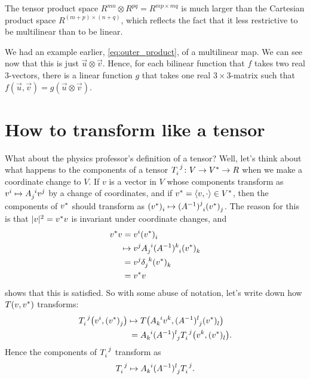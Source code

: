 \documentclass[english, 12pt]{article}
\begin{document}
The tensor product space $R^{mn} \otimes R^{pq} = R^{mp \times mq}$ is much larger than the Cartesian product space $R^{(m + p) \times (n + q)}$, which reflects the fact that it less restrictive to be multilinear than to be linear.

We had an example earlier, \cref{eq:outer_product}, of a multilinear map.
We can see now that this is just $\vec u \otimes \vec v$.
Hence, for each bilinear function that $f$ takes two real $3$-vectors, there is a linear function $g$ that takes one real $3\times3$-matrix such that $f(\vec u, \vec v) = g(\vec u \otimes \vec v)$.


\section{How to transform like a tensor}%
\label{sec:how_to_transform_like_a_tensor}

What about the physics professor's definition of a tensor?
Well, let's think about what happens to the components of a tensor $\tensor{T}{_i^j} \from V \to \dual V \to R$ when we make a coordinate change to $V$.
If $v$ is a vector in $V$ whose components transform as $\tensor{v}{^i} \mapsto \tensor{A}{_j^i} \tensor{v}{^j}$ by a change of coordinates, and if ${v}^{*} = \langle v, \cdot \rangle \in {V}^{*}$, then the components of ${v}^{*}$ should transform as $\tensor{(\dual v)}{_i} \mapsto \tensor{(A^{-1})}{^j_i} \tensor{(\dual v)}{_j}$.
The reason for this is that $|v|^2 = {v}^{*} v$ is invariant under coordinate changes, and
\begin{align*}
	\dual v v ={}& \tensor{v}{^i} \tensor{(\dual v)}{_i}\\
	\mapsto{}& \tensor{v}{^j} \tensor{A}{_j^i} \tensor{(A^{-1})}{^k_i} \tensor{(\dual v)}{_k}\\
	={}& \tensor{v}{^j} \tensor{\delta}{_j^k} \tensor{(\dual v)}{_k}\\
	={}& \dual v v
\end{align*}
shows that this is satisfied.
So with some abuse of notation, let's write down how $T(v, {v}^{*})$ transforms:
\begin{align*}
	\tensor{T}{_i^j}\big(
		\tensor{v}{^i},
		\tensor{(\dual v)}{_j}
	\big)
	\mapsto{}& T\big(
		\tensor{A}{_k^i} \tensor{v}{^k},
		\tensor{(A^{-1})}{^l_j} \tensor{(\dual v)}{_l}
	\big)\\
	={}& \tensor{A}{_k^i} \tensor{(A^{-1})}{^l_j} \tensor{T}{_i^j}
	\big(
		\tensor{v}{^k},
		\tensor{(\dual v)}{_l}
	\big).
\end{align*}
Hence the components of $\tensor{T}{_i^j}$ transform as
\begin{align}\label{eq:tensor_transformation_rules}
	\tensor{T}{_i^j} \mapsto \tensor{A}{_k^i} \tensor{(A^{-1})}{^l_j} \tensor{T}{_i^j}.
\end{align}
\end{document}
